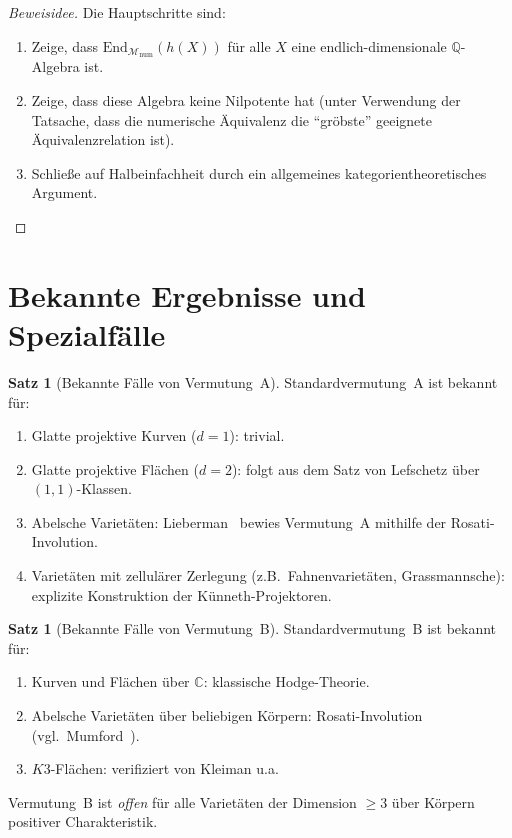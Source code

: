 \documentclass[12pt,a4paper]{amsart}
\theoremstyle{definition}
\newtheorem{satz}[theorem]{Satz}
\newcommand{\Q}{\mathbb{Q}}
\newcommand{\C}{\mathbb{C}}
\newcommand{\End}{\mathrm{End}}
\begin{document}
\begin{proof}[Beweisidee]
Die Hauptschritte sind:
\begin{enumerate}[label=(\arabic*)]
  \item Zeige, dass $\End_{\mathcal{M}_{\mathrm{num}}}(h(X))$ für alle $X$
        eine endlich-dimensionale $\Q$-Algebra ist.
  \item Zeige, dass diese Algebra keine Nilpotente hat (unter Verwendung der
        Tatsache, dass die numerische Äquivalenz die ``gröbste'' geeignete
        Äquivalenzrelation ist).
  \item Schließe auf Halbeinfachheit durch ein allgemeines kategorientheoretisches
        Argument.
\end{enumerate}
\end{proof}

\section{Bekannte Ergebnisse und Spezialfälle}\label{sec:bekannt}

\begin{satz}[Bekannte Fälle von Vermutung~A]
Standardvermutung~A ist bekannt für:
\begin{enumerate}[label=(\roman*)]
  \item Glatte projektive Kurven ($d=1$): trivial.
  \item Glatte projektive Flächen ($d=2$): folgt aus dem Satz von Lefschetz
        über $(1,1)$-Klassen.
  \item Abelsche Varietäten: Lieberman~\cite{lieberman1968} bewies Vermutung~A
        mithilfe der Rosati-Involution.
  \item Varietäten mit zellulärer Zerlegung (z.B.\ Fahnenvarietäten,
        Grassmannsche): explizite Konstruktion der Künneth-Projektoren.
\end{enumerate}
\end{satz}

\begin{satz}[Bekannte Fälle von Vermutung~B]
Standardvermutung~B ist bekannt für:
\begin{enumerate}[label=(\roman*)]
  \item Kurven und Flächen über $\C$: klassische Hodge-Theorie.
  \item Abelsche Varietäten über beliebigen Körpern: Rosati-Involution
        (vgl.\ Mumford~\cite{mumford1970}).
  \item $K3$-Flächen: verifiziert von Kleiman u.a.
\end{enumerate}
Vermutung~B ist \emph{offen} für alle Varietäten der Dimension $\geq 3$
über Körpern positiver Charakteristik.
\end{satz}
\end{document}
